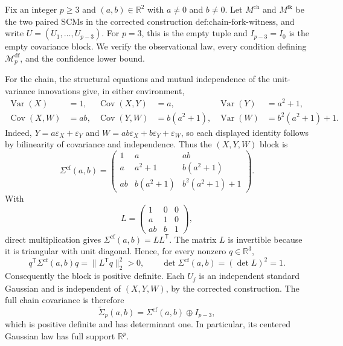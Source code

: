 Fix an integer \(p\ge3\) and \((a,b)\in\mathbb R^2\) with \(a\neq0\) and \(b\neq0\).  Let \(M^{\mathrm{ch}}\) and \(M^{\mathrm{fk}}\) be the two paired SCMs in the corrected construction \(\text{def:chain-fork-witness}\), and write \(U=(U_1,\ldots,U_{p-3})\).  For \(p=3\), this is the empty tuple and \(I_{p-3}=I_0\) is the empty covariance block.  We verify the observational law, every condition defining \(\mathcal M_p^{\mathrm{df}}\), and the confidence lower bound.

For the chain, the structural equations and mutual independence of the unit-variance innovations give, in either environment,
\[
\begin{aligned}
 \operatorname{Var}(X)&=1,
 &\operatorname{Cov}(X,Y)&=a,
 &\operatorname{Var}(Y)&=a^2+1,\\
 \operatorname{Cov}(X,W)&=ab,
 &\operatorname{Cov}(Y,W)&=b(a^2+1),
 &\operatorname{Var}(W)&=b^2(a^2+1)+1.
\end{aligned}
\]
Indeed, \(Y=a\varepsilon_X+\varepsilon_Y\) and \(W=ab\varepsilon_X+b\varepsilon_Y+\varepsilon_W\), so each displayed identity follows by bilinearity of covariance and independence.  Thus the \((X,Y,W)\) block is
\[
 \Sigma^{\mathrm{cf}}(a,b)=
 \begin{pmatrix}
  1&a&ab\\
  a&a^2+1&b(a^2+1)\\
  ab&b(a^2+1)&b^2(a^2+1)+1
 \end{pmatrix}.
\]
With
\[
 L=\begin{pmatrix}1&0&0\\a&1&0\\ab&b&1\end{pmatrix},
\]
direct multiplication gives \(\Sigma^{\mathrm{cf}}(a,b)=LL^{\mathsf T}\).  The matrix \(L\) is invertible because it is triangular with unit diagonal.  Hence, for every nonzero \(q\in\mathbb R^3\),
\[
 q^{\mathsf T}\Sigma^{\mathrm{cf}}(a,b)q
 =\lVert L^{\mathsf T}q\rVert_2^2>0,
 \qquad
 \det\Sigma^{\mathrm{cf}}(a,b)=(\det L)^2=1.
\]
Consequently the block is positive definite.  Each \(U_j\) is an independent standard Gaussian and is independent of \((X,Y,W)\), by the corrected construction.  The full chain covariance is therefore
\[
 \widetilde\Sigma_p(a,b)
 =\Sigma^{\mathrm{cf}}(a,b)\oplus I_{p-3},
\]
which is positive definite and has determinant one.  In particular, its centered Gaussian law has full support \(\mathbb R^p\).


